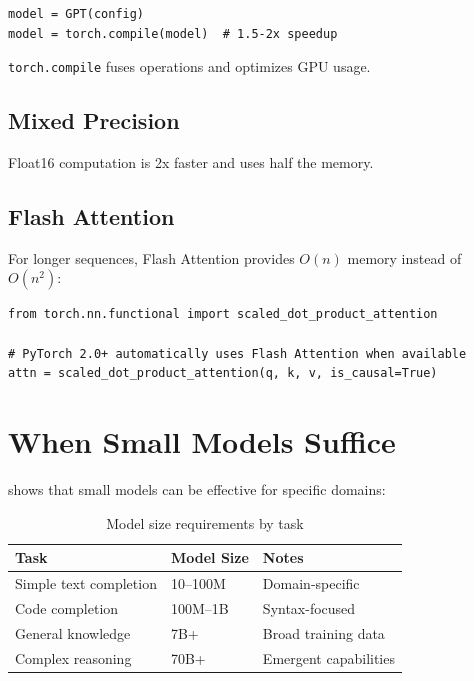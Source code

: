 \begin{lstlisting}[style=python]
model = GPT(config)
model = torch.compile(model)  # 1.5-2x speedup
\end{lstlisting}

\texttt{torch.compile} fuses operations and optimizes GPU usage.

\subsection{Mixed Precision}

Float16 computation is 2x faster and uses half the memory.

\subsection{Flash Attention}

For longer sequences, Flash Attention provides $O(n)$ memory instead of $O(n^2)$:
\begin{lstlisting}[style=python]
from torch.nn.functional import scaled_dot_product_attention

# PyTorch 2.0+ automatically uses Flash Attention when available
attn = scaled_dot_product_attention(q, k, v, is_causal=True)
\end{lstlisting}

\section{When Small Models Suffice}

\TryLM shows that small models can be effective for specific domains:

\begin{table}[H]
\centering
\begin{tabular}{lll}
\toprule
\textbf{Task} & \textbf{Model Size} & \textbf{Notes} \\
\midrule
Simple text completion & 10--100M & Domain-specific \\
Code completion & 100M--1B & Syntax-focused \\
General knowledge & 7B+ & Broad training data \\
Complex reasoning & 70B+ & Emergent capabilities \\
\bottomrule
\end{tabular}
\caption{Model size requirements by task}
\end{table}


